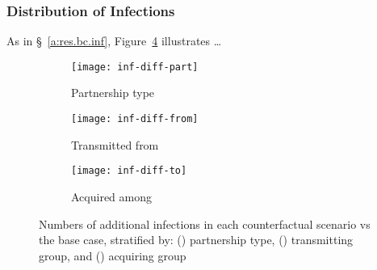 \subsubsection{Distribution of Infections}\label{a:res.1.inf}
As in \S~\ref{a:res.bc.inf}, Figure~\ref{fig:inf.diff} illustrates \dots
\begin{figure}[h]
  \begin{subfigure}{\linewidth}
    \centerline{\texttt{[image: inf-diff-part]}}
    \caption{Partnership type}
    \label{fig:inf.diff.part}
  \end{subfigure}
  \begin{subfigure}{\linewidth}
    \centerline{\texttt{[image: inf-diff-from]}}
    \caption{Transmitted from}
    \label{fig:inf.diff.from}
  \end{subfigure}
  \begin{subfigure}{\linewidth}
    \centerline{\texttt{[image: inf-diff-to]}}
    \caption{Acquired among}
    \label{fig:inf.diff.to}
  \end{subfigure}
  \caption{Numbers of additional infections in each counterfactual scenario vs the base case, stratified by:
    () partnership type,
    () transmitting group, and
    () acquiring group}
  \label{fig:inf.diff}
\end{figure}
\clearpage
